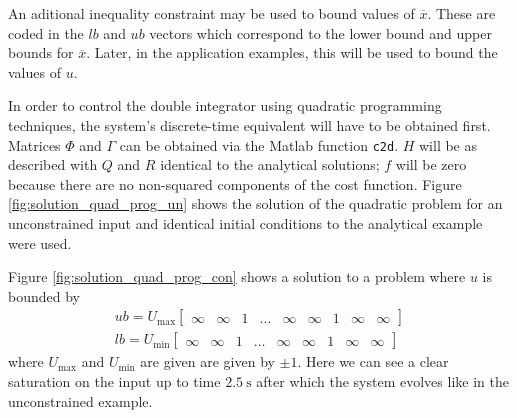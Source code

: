 \par An aditional inequality constraint may be used to bound values of $\overline{x}$. These are coded in the $lb$ and $ub$ vectors which correspond to the lower bound and upper bounds for $\overline{x}$. Later, in the application examples, this will be used to bound the values of $u$.


\par In order to control the double integrator using quadratic programming techniques, the system's discrete-time equivalent will have to be obtained first. Matrices $\Phi$ and $\Gamma$ can be obtained via the Matlab function \texttt{c2d}. $H$ will be as described with $Q$ and $R$ identical to the analytical solutions; $f$ will be zero because there are no non-squared components of the cost function. Figure \ref{fig:solution_quad_prog_un} shows the solution of the quadratic problem for an unconstrained input and identical initial conditions to the analytical example were used.

\par Figure \ref{fig:solution_quad_prog_con} shows a solution to a problem where $u$ is bounded by
\begin{equation}
\label{eq:quad_prog_ineq_constr}
\begin{gathered}
    ub = U_{\text{max}} \begin{bmatrix} \infty & \infty & 1 & \ldots & \infty & \infty & 1 & \infty & \infty \end{bmatrix} \\
    lb = U_{\text{min}} \begin{bmatrix} \infty & \infty & 1 & \ldots & \infty & \infty & 1 & \infty & \infty \end{bmatrix} 
\end{gathered}
\end{equation}
where $U_{\text{max}}$ and $U_{\text{min}}$ are given are given by $\pm 1$. Here we can see a clear saturation on the input up to time $\SI{2.5}{\second}$ after which the system evolves like in the unconstrained example.

